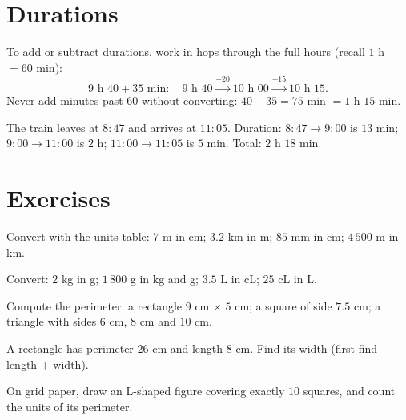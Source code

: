 \section{Durations}

\begin{method}\label{met:g4:measure:time}
To add or subtract durations, work in hops through the full hours
(recall $1$ h $= 60$ min):
\[
9\text{ h }40 + 35 \text{ min}:
\quad 9\text{ h }40 \xrightarrow{+20} 10\text{ h }00
\xrightarrow{+15} 10\text{ h }15 .
\]
Never add minutes past $60$ without converting: $40 + 35 = 75$ min
$= 1$ h $15$ min.
\end{method}

\begin{example}\label{ex:g4:measure:timetable}
The train leaves at $8{:}47$ and arrives at $11{:}05$. Duration:
$8{:}47 \to 9{:}00$ is $13$ min; $9{:}00 \to 11{:}00$ is $2$ h;
$11{:}00 \to 11{:}05$ is $5$ min. Total: $2$ h $18$ min.
\end{example}

\section{Exercises}

\begin{exercise}[$\star$]\label{exo:g4:measure:1}
Convert with the units table: $7$ m in cm; $3.2$ km in m; $85$ mm in
cm; $4\,500$ m in km.
\end{exercise}

\begin{exercise}[$\star$]\label{exo:g4:measure:2}
Convert: $2$ kg in g; $1\,800$ g in kg and g; $3.5$ L in cL;
$25$ cL in L.
\end{exercise}

\begin{exercise}[$\star$]\label{exo:g4:measure:3}
Compute the perimeter: a rectangle $9$ cm $\times$ $5$ cm; a square
of side $7.5$ cm; a triangle with sides $6$ cm, $8$ cm and $10$ cm.
\end{exercise}

\begin{exercise}[$\star$]\label{exo:g4:measure:4}
A rectangle has perimeter $26$ cm and length $8$ cm. Find its width
(first find length $+$ width).
\end{exercise}

\begin{exercise}[$\star$]\label{exo:g4:measure:5}
On grid paper, draw an L-shaped figure covering exactly $10$
squares, and count the units of its perimeter.
\end{exercise}

